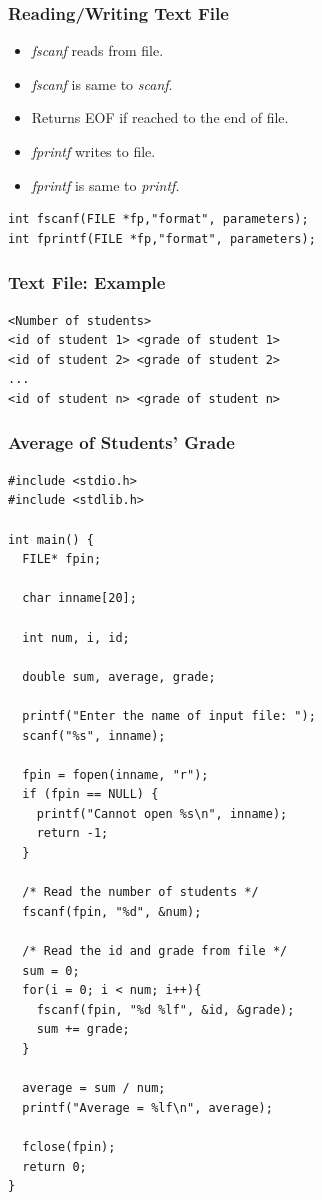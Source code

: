 \documentclass{../c-lecture}
\begin{document}
\begin{frame}[fragile]
  \frametitle{Reading/Writing Text File}
  \begin{itemize}
    \item \textit{\color{YellowOrange} fscanf} reads from file.
    \item
      \textit{\color{YellowOrange}fscanf} is same to
      \textit{\color{LimeGreen} scanf}.

    \item Returns EOF if reached to the end of file.
    \item \textit{\color{Cyan} fprintf} writes to file.
    \item
      \textit{\color{Cyan} fprintf} is same to
      \textit{\color{Violet} printf}.

  \end{itemize}
  \begin{verbatim}
int fscanf(FILE *fp,"format", parameters);
int fprintf(FILE *fp,"format", parameters);
  \end{verbatim}
\end{frame}

\begin{frame}[fragile]
  \frametitle{Text File: Example}
  \begin{verbatim}
<Number of students>
<id of student 1> <grade of student 1>
<id of student 2> <grade of student 2>
...
<id of student n> <grade of student n>
  \end{verbatim}
\end{frame}

\begin{frame}[fragile]
  \frametitle{Average of Students' Grade}
  \tiny
  \begin{verbatim}
#include <stdio.h>
#include <stdlib.h>

int main() {
  FILE* fpin;

  char inname[20];

  int num, i, id;

  double sum, average, grade;

  printf("Enter the name of input file: ");
  scanf("%s", inname);

  fpin = fopen(inname, "r");
  if (fpin == NULL) {
    printf("Cannot open %s\n", inname);
    return -1;
  }

  /* Read the number of students */
  fscanf(fpin, "%d", &num);

  /* Read the id and grade from file */
  sum = 0;
  for(i = 0; i < num; i++){
    fscanf(fpin, "%d %lf", &id, &grade);
    sum += grade;
  }

  average = sum / num;
  printf("Average = %lf\n", average);

  fclose(fpin);
  return 0;
}
  \end{verbatim}
\end{frame}
\end{document}
